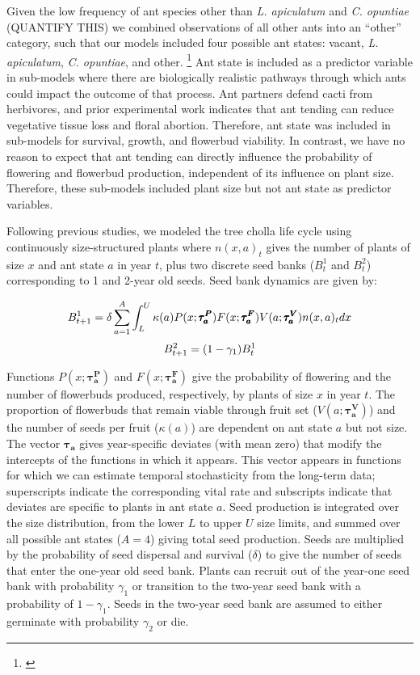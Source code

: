 \documentclass[11pt]{article}
\newcommand{\tom}[2]{{\color{red}{#1}}\footnote{\textit{\color{red}{#2}}}}
\begin{document}
Given the low frequency of ant species other than \textit{L. apiculatum} and \textit{C. opuntiae} (QUANTIFY THIS) we combined observations of all other ants into an ``other'' category, such that our models included four possible ant states: vacant, \textit{L. apiculatum}, \textit{C. opuntiae}, and other. \tom{}{Need a sentence here describing the composition of ``other''.}
Ant state is included as a predictor variable in sub-models where there are biologically realistic pathways through which ants could impact the outcome of that process. 
Ant partners defend cacti from herbivores, and prior experimental work indicates that ant tending can reduce vegetative tissue loss and floral abortion.
Therefore, ant state was included in sub-models for survival, growth, and flowerbud viability. 
In contrast, we have no reason to expect that ant tending can directly influence the probability of flowering and flowerbud production, independent of its influence on plant size. 
Therefore, these sub-models included plant size but not ant state as predictor variables. 

Following previous studies, we modeled the tree cholla life cycle using continuously size-structured plants where $n(x,a)_{t}$ gives the number of plants of size $x$ and ant state $a$ in year $t$, plus two discrete seed banks ($B^1_{t}$ and $B^2_{t}$) corresponding to 1 and 2-year old seeds.
Seed bank dynamics are given by:

\begin{linenomath*}
	$$
	B^1_{t+1} = \delta \sum_{a=1}^{A} \int_L^U  \kappa(a) P(x;\pmb{\tau^P_{a}}) F(x;\pmb{\tau^F_{a}}) V(a;\pmb{\tau^V_{a}}) n(x,a)_{t} dx \\
	$$
	$$
	B^2_{t+1} =  (1 - \gamma_1)B^1_{t}\\
	$$
\end{linenomath*}

Functions $P(x;\pmb{\tau^P_{a}})$ and $F(x;\pmb{\tau^F_{a}})$ give the probability of flowering and the number of flowerbuds produced, respectively, by plants of size $x$ in year $t$. 
The proportion of flowerbuds that remain viable through fruit set ($V(a;\pmb{\tau^V_{a}})$) and the number of seeds per fruit ($\kappa(a)$) are dependent on ant state $a$ but not size. 
The vector $\pmb{\tau_{a}}$ gives year-specific deviates (with mean zero) that modify the intercepts of the functions in which it appears. 
This vector appears in functions for which we can estimate temporal stochasticity from the long-term data; superscripts indicate the corresponding vital rate and subscripts indicate that deviates are specific to plants in ant state $a$. 
Seed production is integrated over the size distribution, from the lower $L$ to upper $U$ size limits, and summed over all possible ant states ($A=4$) giving total seed production. 
Seeds are multiplied by the probability of seed dispersal and survival ($\delta$) to give the number of seeds that enter the one-year old seed bank. 
Plants can recruit out of the year-one seed bank with probability $\gamma_1$ or transition to the two-year seed bank with a probability of $1 - \gamma_1$. 
Seeds in the two-year seed bank are assumed to either germinate with probability $\gamma_2$ or die. 
\end{document}
